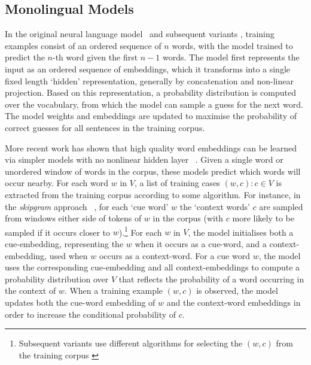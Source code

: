 \documentclass{article} %
\begin{document}
\subsection{Monolingual Models}

In the original neural language model~\citep{Bengio2003lm} and subsequent
variants \citep{collobert2008unified}, training examples consist of an ordered sequence of $n$ words,
with the model trained to predict the $n$-th word given the first $n-1$
words. The model first represents the input as an ordered sequence of embeddings,
which it transforms into a single fixed length `hidden' representation, generally by concatenation and non-linear projection.
Based on this representation, a probability distribution is
computed over the vocabulary, from which the model can sample a guess for the
next word. The model weights and embeddings are updated to maximise the
probability of correct guesses for all sentences in the
training corpus. 
 
More recent work has shown that high quality word embeddings can be learned via simpler models
with no nonlinear hidden layer ~\citep{mikolov2013distributed,Pennington2014}. Given a single word or unordered window of words in the corpus, these models predict which words will occur nearby. For each word \( w\) in \(V\), a list of training cases \({(w,c) : c \in V }\) is extracted from the training corpus according to some algorithm.  For instance, in the \emph{skipgram}
approach ~\citep{mikolov2013distributed}, for each `cue word' \(w\) the `context words' \(c\) are sampled
from windows either side of tokens of \(w\) in the corpus (with \(c\) more
likely to be sampled if it occurs closer to \(w\)).\footnote{
    Subsequent variants use different algorithms for selecting the
    \((w,c)\) from the training corpus \citep{Hill2014EMNLP,levy2014dependency}
} For each \(w\) in \( V\), the model initialises both a
cue-embedding, representing the \(w\) when it occurs as a cue-word, and a
context-embedding, used when \(w\) occurs as a context-word. For a cue word
\(w\), the model uses the corresponding cue-embedding and all
context-embeddings to compute a probability distribution over \(V\) that
reflects the probability of a word occurring in the context of \(w\). When a
training example \((w,c)\) is observed, the model updates both the cue-word
embedding of \(w\) and the context-word embeddings in order to increase the
conditional probability of \(c\). 
\end{document}
